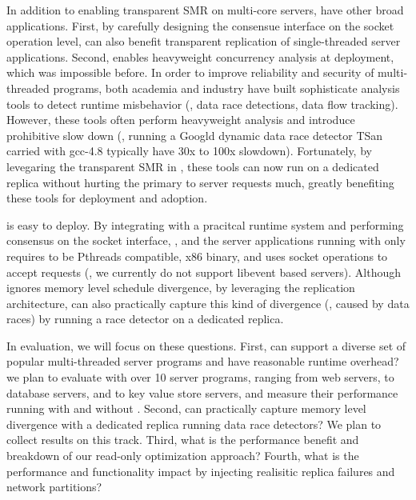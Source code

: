In addition to enabling transparent SMR on multi-core servers, \msmr have other 
broad applications. First, by carefully designing the consensue interface on 
the socket operation level, \msmr can also benefit transparent replication of 
single-threaded server applications. Second, \msmr enables heavyweight concurrency analysis at 
deployment, which was impossible before. In order to improve reliability and 
security of multi-threaded programs, both academia and industry have built 
sophisticate analysis tools to detect runtime misbehavior (\eg, data race detections, 
data flow tracking). However, these tools often perform heavyweight 
analysis and introduce prohibitive slow down (\eg, running a Googld dynamic data race detector 
TSan carried with gcc-4.8 typically have 30x to 100x slowdown). Fortunately, by 
levegaring the transparent SMR in \msmr, these tools can now run on a dedicated 
replica without hurting the primary to server requests much, greatly benefiting 
these tools for deployment and adoption.

\msmr is easy to deploy.
By integrating with a pracitcal \msmr runtime system \parrot and 
performing consensus on the socket interface, ,
and the server applications running with \msmr 
only requires to be Pthreads compatible, x86 binary, and uses socket operations 
to accept requests (\ie, we currently do not support libevent based servers). 
Although \parrot ignores memory level schedule divergence, by leveraging the replication architecture,
\msmr can also practically capture  this kind of divergence (\eg, caused by data races) by running a 
race detector on a dedicated replica.

In evaluation, we will focus on these questions. First, can \msmr support a diverse 
set of popular multi-threaded server programs and have reasonable runtime overhead? we plan to evaluate \msmr with 
over 10 server programs, ranging from web servers, to database servers, and to 
key value store servers, and measure their performance running with and without \msmr.
Second, can \msmr practically capture memory level divergence with a dedicated 
replica running data race detectors? We plan to collect results on this track. 
Third, what is the performance benefit and breakdown of our read-only 
optimization approach? Fourth, what is the performance and functionality impact 
by injecting realisitic replica failures and network partitions?

  



